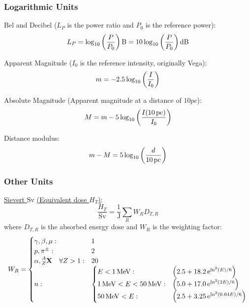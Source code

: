 		\subsubsection{Logarithmic Units}
			\noindent
			Bel and Decibel ($L_P$ is the power ratio and $P_0$ is the reference power):
			\begin{equation}
				L_P = \log_{10}\qty(\frac{P}{P_0})\,\mathrm{B} 
				=10\log_{10}\qty(\frac{P}{P_0})\,\mathrm{dB}
			\end{equation}

			\noindent
			Apparent Magnitude ($I_0$ is the reference intensity, originally Vega):
			\begin{equation}
				m = -2.5 \log_{10} \qty( \frac{I}{I_0} )
			\end{equation}
			
			\noindent
			Absolute Magnitude (Apparent magnitude at a distance of $10\unit{pc}$):
			\begin{equation}
				M = m - 5 \log_{10} \qty( \frac{I(10\,\mathrm{pc})}{I_0} )
			\end{equation}
			
			\noindent
			Distance modulus:
			\begin{equation}
				m - M = 5 \log_{10} \qty( \frac{d}{10\,\mathrm{pc}} )
			\end{equation}

		\subsubsection{Other Units}
			\href{https://en.wikipedia.org/wiki/Sievert}{Sievert $\mathrm{Sv}$} \href{https://en.wikipedia.org/wiki/Equivalent_dose}{(Equivalent dose $H_T$)}:
			\begin{equation}
				\frac{H_T}{\mathrm{Sv}} = \frac{1}{\mathrm{J}}\sum_R W_R D_{T,R}			
			\end{equation}
			where $D_{T,R}$ is the absorbed energy dose and $W_R$ is the weighting factor:
			\begin{equation}
				\begin{aligned}
					W_R =
					\begin{cases}
						\gamma,\beta,\mu: & 1 \\
						p, \pi^\pm: & 2 \\
						\alpha, \prescript{A}{Z}{\mathbf{X}}\quad\forall Z>1: & 20 \\
						n: &\begin{cases}
							E<1\,\mathrm{MeV}: & \qty(2.5+18.2 \,\mathrm{e}^{\ln^2(E)/6}) \\
							1\,\mathrm{MeV} <E<50\,\mathrm{MeV}: & \qty(5.0+17.0 \,\mathrm{e}^{\ln^2(2E)/6}) \\
							50\,\mathrm{MeV}<E: & \qty(2.5+3.25 \,\mathrm{e}^{\ln^2(0.04E)/6}) \\
						\end{cases}
					\end{cases}\\
				\end{aligned}
			\end{equation}

